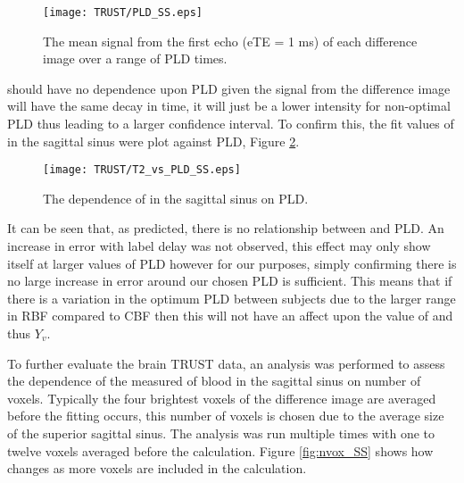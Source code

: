 \begin{figure}[H]
	\centering
	\texttt{[image: TRUST/PLD\_SS.eps]}
	\caption{The mean signal from the first echo (\ac{eTE} = 1 ms) of each difference image over a range of \ac{PLD} times.}
	\label{fig:Sig_vs_PLD_SS}	
\end{figure}

\ttwo should have no dependence upon \ac{PLD} given the signal from the difference image will have the same decay in time, it will just be a lower intensity for non-optimal \ac{PLD} thus leading to a larger confidence interval. To confirm this, the fit values of \ttwo in the sagittal sinus were plot against \ac{PLD}, Figure \ref{fig:SS_T2vsPLD}.

\begin{figure}[H]
	\centering
	\texttt{[image: TRUST/T2\_vs\_PLD\_SS.eps]}
	\caption{The dependence of \ttwo in the sagittal sinus on \ac{PLD}.}
	\label{fig:SS_T2vsPLD}	
\end{figure}


It can be seen that, as predicted, there is no relationship between \ttwo and \ac{PLD}. An increase in error with label delay was not observed, this effect may only show itself at larger values of \ac{PLD} however for our purposes, simply confirming there is no large increase in error around our chosen \ac{PLD} is sufficient. This means that if there is a variation in the optimum \ac{PLD} between subjects due to the larger range in \ac{RBF} compared to \ac{CBF} then this will not have an affect upon the value of \ttwo and thus $Y_v$.

To further evaluate the brain \ac{TRUST} data, an analysis was performed to assess the dependence of the measured \ttwo of blood in the sagittal sinus on number of voxels. Typically the four brightest voxels of the difference image are averaged before the fitting occurs, this number of voxels is chosen due to the average size of the superior sagittal sinus. The analysis was run multiple times with one to twelve voxels averaged before the calculation. Figure \ref{fig:nvox_SS} shows how \ttwo changes as more voxels are included in the calculation. %

